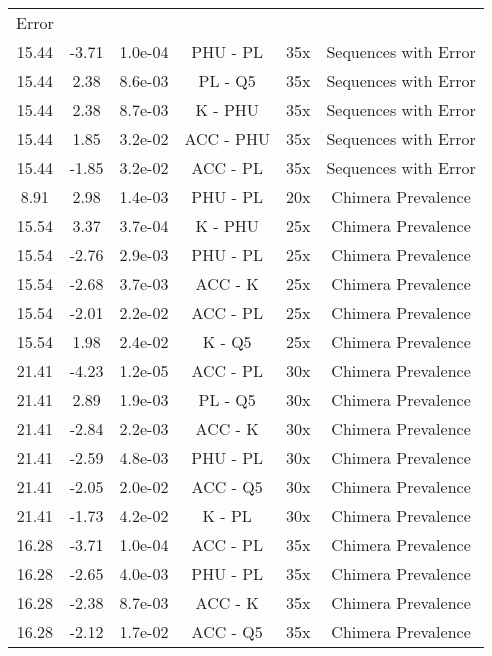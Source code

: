 \documentclass[11pt,]{article}
\begin{document}
\begin{longtable}[]{@{}cccccc@{}}
Error\tabularnewline
15.44 & -3.71 & 1.0e-04 & PHU - PL & 35x & Sequences with
Error\tabularnewline
15.44 & 2.38 & 8.6e-03 & PL - Q5 & 35x & Sequences with
Error\tabularnewline
15.44 & 2.38 & 8.7e-03 & K - PHU & 35x & Sequences with
Error\tabularnewline
15.44 & 1.85 & 3.2e-02 & ACC - PHU & 35x & Sequences with
Error\tabularnewline
15.44 & -1.85 & 3.2e-02 & ACC - PL & 35x & Sequences with
Error\tabularnewline
8.91 & 2.98 & 1.4e-03 & PHU - PL & 20x & Chimera
Prevalence\tabularnewline
15.54 & 3.37 & 3.7e-04 & K - PHU & 25x & Chimera
Prevalence\tabularnewline
15.54 & -2.76 & 2.9e-03 & PHU - PL & 25x & Chimera
Prevalence\tabularnewline
15.54 & -2.68 & 3.7e-03 & ACC - K & 25x & Chimera
Prevalence\tabularnewline
15.54 & -2.01 & 2.2e-02 & ACC - PL & 25x & Chimera
Prevalence\tabularnewline
15.54 & 1.98 & 2.4e-02 & K - Q5 & 25x & Chimera
Prevalence\tabularnewline
21.41 & -4.23 & 1.2e-05 & ACC - PL & 30x & Chimera
Prevalence\tabularnewline
21.41 & 2.89 & 1.9e-03 & PL - Q5 & 30x & Chimera
Prevalence\tabularnewline
21.41 & -2.84 & 2.2e-03 & ACC - K & 30x & Chimera
Prevalence\tabularnewline
21.41 & -2.59 & 4.8e-03 & PHU - PL & 30x & Chimera
Prevalence\tabularnewline
21.41 & -2.05 & 2.0e-02 & ACC - Q5 & 30x & Chimera
Prevalence\tabularnewline
21.41 & -1.73 & 4.2e-02 & K - PL & 30x & Chimera
Prevalence\tabularnewline
16.28 & -3.71 & 1.0e-04 & ACC - PL & 35x & Chimera
Prevalence\tabularnewline
16.28 & -2.65 & 4.0e-03 & PHU - PL & 35x & Chimera
Prevalence\tabularnewline
16.28 & -2.38 & 8.7e-03 & ACC - K & 35x & Chimera
Prevalence\tabularnewline
16.28 & -2.12 & 1.7e-02 & ACC - Q5 & 35x & Chimera
Prevalence\tabularnewline
\bottomrule
\end{longtable}

\newpage
\end{document}
